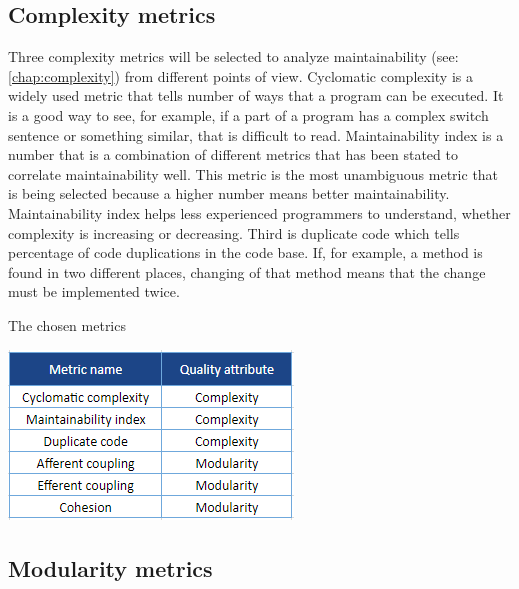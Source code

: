 \subsection{Complexity metrics}

Three complexity metrics will be selected to analyze maintainability (see: \autoref{chap:complexity}) from different points of view. Cyclomatic complexity is a widely used metric that tells number of ways that a program can be executed. It is a good way to see, for example, if a part of a program  has a complex switch sentence or something similar, that is difficult to read.
Maintainability index is a number that is a combination of different metrics that has been stated to correlate maintainability well. This metric is the most unambiguous metric that is being selected because a higher number means better maintainability. Maintainability index helps less experienced programmers to understand, whether complexity is increasing or decreasing. Third is duplicate code which tells percentage of code duplications in the code base. If, for example, a method is found in two different places, changing of that method means that the change must be implemented twice.

\begin{table}[t!]
\centering
\caption{The chosen metrics}
\includegraphics[scale=1]{metrics.png}
\label{fig:metrics}
\end{table}

\subsection{Modularity metrics}

